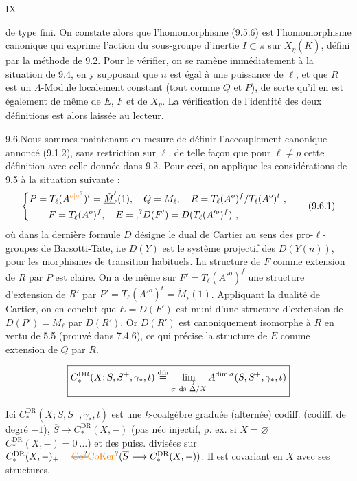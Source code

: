 \hfill IX

de type fini. On constate alors que l'homomorphisme (9.5.6) est l'homomorphisme canonique qui exprime l'action du sous-groupe d'inertie $I\subset\pi$ sur $X_\eta(\overline K)$, défini par la méthode de 9.2. Pour le vérifier, on se ramène immédiatement à la situation de 9.4, en y supposant que $n$ est égal à une puissance de $\ell$, et que $R$ est un $\Lambda$-Module localement constant (tout comme $Q$ et $P$), de sorte qu'il en est également de même de $E$, $F$ et de $X_\eta$. La vérification de l'identité des deux définitions est alors laissée au lecteur.

9.6.\quad Nous sommes maintenant en mesure de définir l'accouplement canonique annoncé (9.1.2), sans restriction sur $\ell$, de telle façon que pour $\ell\neq p$ cette définition  avec celle donnée dans 9.2. Pour ceci, on applique les considérations de 9.5 à la situation suivante :
\[
\left\{\begin{aligned}
 &P=T_\ell(A^{\unsure{o|\circ}})^t=\underline{\check M}'_\ell(1),\quad Q=M_\ell,\quad R=T_\ell(A^o)^f/T_\ell(A^o)^t\ ,\\
 &\hspace{2em}F=T_\ell(A^o)^f,\quad E=\unsure{,}D(F')=D(T_\ell(A'^{o})^f)\ ,
\end{aligned}\right.
\tag*{(9.6.1)}
\]
où dans la dernière formule $D$ désigne le dual de Cartier au sens des pro-$\ell$-groupes de Barsotti-Tate, i.e $D(Y)$ est le système \uline{projectif} des $D(Y(n))$, pour les morphismes de transition habituels. La structure de $F$ comme extension de $R$ par $P$ est claire. On a de même sur $F'=T_\ell(A'^{o})^f$ une structure d'extension de $R'$ par $P'=T_\ell(A'^{o})^t=\underline{\check M}_\ell(1)$. Appliquant la dualité de Cartier, on en conclut que $E=D(F')$ est muni d'une structure d'extension de $D(P')=M_\ell$ par $D(R')$. Or $D(R')$ est canoniquement isomorphe à $R$ en vertu de 5.5 (prouvé dans 7.4.6), ce qui précise la structure de $E$ comme extension de $Q$ par $R$.

\[
\boxed{C_*^{\mathrm{DR}}(X;S,S^+,\gamma_*,t)
 \mathrel{\overset{\mathrm{dfn}}{=}}\varinjlim_{\sigma\ \mathrm{ds}\ \Delta/X}
 A^{\mathrm{dim}\,\sigma}(S,S^+,\gamma_*,t)}
\]

Ici $C_*^{\mathrm{DR}}(X;S,S^+,\gamma_*,t)$ est une $k$-coalgèbre graduée (alternée) codiff. (codiff. de degré $-1$),  $\overline S\longrightarrow C_*^{\mathrm{DR}}(X,-)$  (pas néc injectif, p. ex. si $X=\varnothing$ $C_*^{\mathrm{DR}}(X,-)=0\ \ldots$) et des puiss. divisées sur  $C_*^{\mathrm{DR}}(X,-)_+=\deleted{\unsure{\mathrm{Co}}}\unsure{\mathrm{CoKer}}(\overline S\longrightarrow C_*^{\mathrm{DR}}(X,-))$. Il est covariant en $X$ avec  ses structures, 

